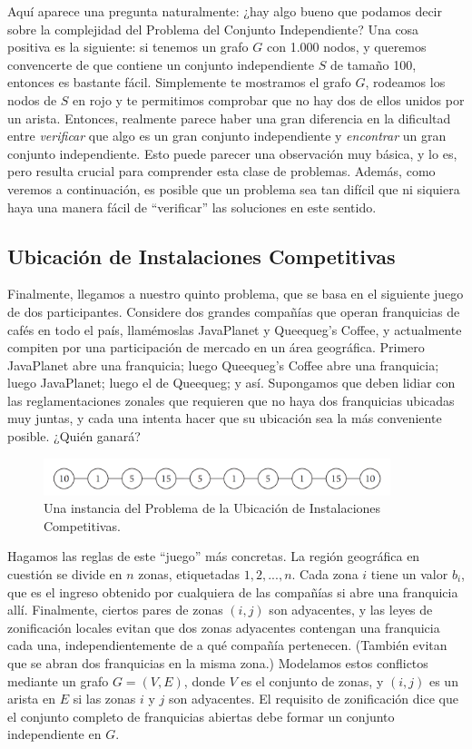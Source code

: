 \documentclass[a4paper, 12pt]{book}
\theoremstyle{dotless}
\begin{document}
Aquí aparece una pregunta naturalmente: ¿hay algo bueno que podamos decir sobre la complejidad del Problema del Conjunto Independiente? Una cosa positiva es la siguiente: si tenemos un grafo $G$ con 1.000 nodos, y queremos convencerte de que contiene un conjunto independiente $S$ de tamaño 100, entonces es bastante fácil. Simplemente te mostramos el grafo $G$, rodeamos los nodos de $S$ en rojo y te permitimos comprobar que no hay dos de ellos unidos por un arista. Entonces, realmente parece haber una gran diferencia en la dificultad entre \textit{verificar} que algo es un gran conjunto independiente y \textit{encontrar} un gran conjunto independiente. Esto puede parecer una observación muy básica, y lo es, pero resulta crucial para comprender esta clase de problemas. Además, como veremos a continuación, es posible que un problema sea tan difícil que ni siquiera haya una manera fácil de ``verificar'' las soluciones en este sentido.

\subsection*{Ubicación de Instalaciones Competitivas}
%
Finalmente, llegamos a nuestro quinto problema, que se basa en el siguiente juego de dos participantes. Considere dos grandes compañías que operan franquicias de cafés en todo el país, llamémoslas JavaPlanet y Queequeg's Coffee, y actualmente compiten por una participación de mercado en un área geográfica. Primero JavaPlanet abre una franquicia; luego Queequeg's Coffee abre una franquicia; luego JavaPlanet; luego el de Queequeg; y así. Supongamos que deben lidiar con las reglamentaciones zonales que requieren que no haya dos franquicias ubicadas muy juntas, y cada una intenta hacer que su ubicación sea la más conveniente posible. ¿Quién ganará?

\begin{figure}[h]
\centering
\includegraphics[width=0.9\textwidth]{Imagenes-Seccion1/fig1-7.PNG}
\caption{Una instancia del Problema de la Ubicación de Instalaciones Competitivas.}
\label{fig:Imagenes-Seccion1/fig1-7.PNG}
\end{figure}

Hagamos las reglas de este ``juego'' más concretas. La región geográfica en cuestión se divide en $n$ zonas, etiquetadas $1, 2,. . . ,n$. Cada zona $i$ tiene un valor $b_i$, que es el ingreso obtenido por cualquiera de las compañías si abre una franquicia allí. Finalmente, ciertos pares de zonas $(i,j)$ son adyacentes, y las leyes de zonificación locales evitan que dos zonas adyacentes contengan una franquicia cada una, independientemente de a qué compañía pertenecen. (También evitan que se abran dos franquicias en la misma zona.) Modelamos estos conflictos mediante un grafo $G=(V,E)$, donde $V$ es el conjunto de zonas, y $(i,j)$ es un arista en $E$ si las zonas $i$ y $j$ son adyacentes. El requisito de zonificación dice que el conjunto completo de franquicias abiertas debe formar un conjunto independiente en $G$.
\end{document}
